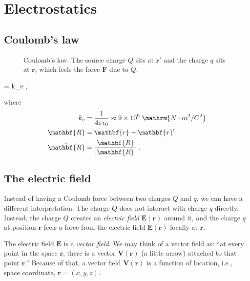\documentclass[../book.tex]{subfiles}
\begin{document}
\chapter{Electrostatics}
\label{ch:electrostatics}

\section{Coulomb's law}

\begin{figure}[htbp]
  \centering
  \caption{Coulomb's law. The source charge $Q$ sits at $\mathbf{r}'$ and the
  charge $q$ sits at $\mathbf{r}$, which feels the force $\mathbf{F}$ due to $Q$.}
  \label{fig:coulomb-law}
\end{figure}


\begin{keyeq}
  \label{eq:coulomb-law}
  =
  k_e 
  \;,
\end{keyeq}
where
\begin{align}
    k_e
    &=
    \frac{1}{4 \pi \epsilon_0}
    \approx 9 \times 10^9 \;\mathrm{N \cdot m^2 / C^2}
    \\
    \mathbf{R}
    &=
    \mathbf{r} - \mathbf{r}'
    \\
    \hat{\mathbf{R}}
    &=
    \frac{
    \mathbf{R}
    }{
    \abs{\mathbf{R}}
    }
    \;.
\end{align}



\section{The electric field}
Instead of having a Coulomb force between two charges $Q$ and $q$, we can have a different interpretation: The charge $Q$ does not interact with charge $q$ directly. Instead, the charge $Q$ creates an \emph{electric field} $\mathbf{E}(\mathbf{r})$ around it, and the charge $q$ at position $\mathbf{r}$ feels a force from the electric field $\mathbf{E}(\mathbf{r})$ locally at $\mathbf{r}$. 

The electric field $\mathbf{E}$ is a \emph{vector field}. We may think of a vector field as: ``at every point in the space $\mathbf{r}$, there is a vector $\mathbf{V}(\mathbf{r})$ (a little arrow) attached to that point $\mathbf{r}$.'' Because of that, a vector field $\mathbf{V}(\mathbf{r})$ is a function of location, i.e., space coordinate, $\mathbf{r}=(x,y,z)$.
\end{document}
